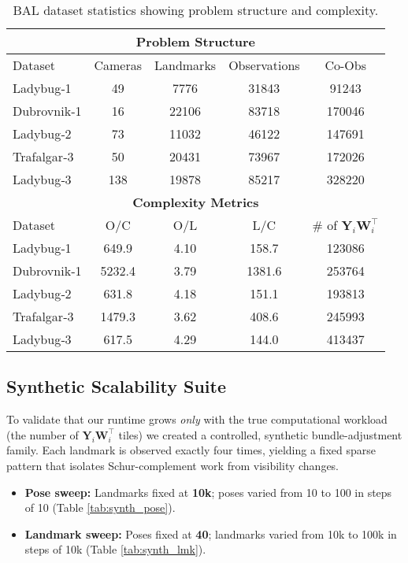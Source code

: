 \begin{table}[b]
\caption{BAL dataset statistics showing problem structure and complexity.}
\label{tab:exp_datasets}
\centering
\footnotesize
\begin{tabular}{@{}lcccc@{}}
\toprule
\multicolumn{5}{c}{\textbf{Problem Structure}} \\
\midrule
Dataset & Cameras & Landmarks & Observations & Co-Obs \\
\midrule
Ladybug‑1   & 49  & 7776  & 31843 & 91243 \\
Dubrovnik‑1 & 16  & 22106 & 83718 & 170046 \\
Ladybug‑2   & 73  & 11032 & 46122 & 147691 \\
Trafalgar‑3 & 50  & 20431 & 73967 & 172026 \\
Ladybug‑3   & 138 & 19878 & 85217 & 328220 \\
\midrule
\multicolumn{5}{c}{\textbf{Complexity Metrics}} \\
\midrule
Dataset & O/C & O/L & L/C & \# of $\mathbf Y_i\mathbf W_i^{\top}$ \\
\midrule
Ladybug‑1   & 649.9 & 4.10 & 158.7  & 123086 \\
Dubrovnik‑1 & 5232.4 & 3.79 & 1381.6 & 253764 \\
Ladybug‑2   & 631.8 & 4.18 & 151.1 & 193813 \\
Trafalgar‑3 & 1479.3 & 3.62 & 408.6 & 245993 \\
Ladybug‑3   & 617.5 & 4.29 & 144.0 & 413437 \\
\bottomrule
\end{tabular}
\end{table}

\subsection{Synthetic Scalability Suite}
\label{subsec:exp_synth}
To validate that our runtime grows \emph{only} with the true
computational workload (the number of $\mathbf Y_i\mathbf W_i^{\top}$
tiles) we created a controlled, synthetic bundle-adjustment family.
Each landmark is observed exactly four times, yielding a fixed sparse
pattern that isolates Schur-complement work from visibility changes.
\begin{itemize}
  \item \textbf{Pose sweep:} Landmarks fixed at \textbf{10k}; poses varied
        from 10 to 100 in steps of 10 (Table \ref{tab:synth_pose}).
  \item \textbf{Landmark sweep:} Poses fixed at \textbf{40}; landmarks
        varied from 10k to 100k in steps of 10k
        (Table \ref{tab:synth_lmk}).
\end{itemize}

